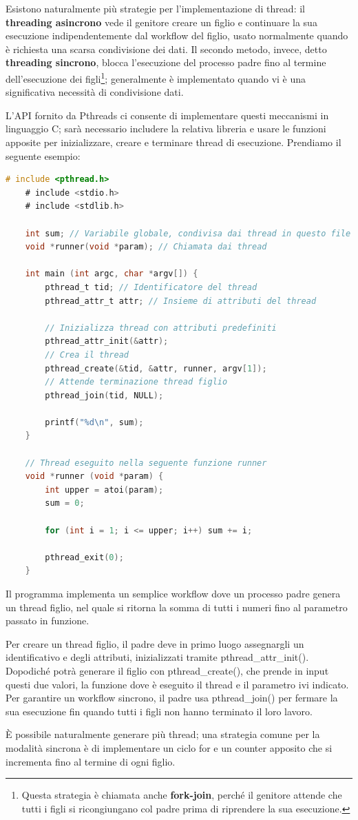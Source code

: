 \noindent Esistono naturalmente più strategie per l'implementazione di thread: il \textbf{threading asincrono} vede il genitore creare un figlio e
continuare la sua esecuzione indipendentemente dal workflow del figlio, usato normalmente quando è richiesta una scarsa condivisione dei dati. Il
secondo metodo, invece, detto \textbf{threading sincrono}, blocca l'esecuzione del processo padre fino al termine dell'esecuzione dei
figli\footnote{Questa strategia è chiamata anche \textbf{fork-join}, perché il genitore attende che tutti i figli si ricongiungano col padre prima di
riprendere la sua esecuzione.}; generalmente è implementato quando vi è una significativa necessità di condivisione dati.\par
L'API fornito da Pthreads ci consente di implementare questi meccanismi in linguaggio C; sarà necessario includere la relativa libreria e usare le
funzioni apposite per inizializzare, creare e terminare thread di esecuzione. Prendiamo il seguente esempio: \begin{lstlisting}[language=C]
	# include <pthread.h>
	# include <stdio.h>
	# include <stdlib.h>
	
	int sum; // Variabile globale, condivisa dai thread in questo file
	void *runner(void *param); // Chiamata dai thread
	
	int main (int argc, char *argv[]) {
		pthread_t tid; // Identificatore del thread
		pthread_attr_t attr; // Insieme di attributi del thread
		
		// Inizializza thread con attributi predefiniti
		pthread_attr_init(&attr);
		// Crea il thread
		pthread_create(&tid, &attr, runner, argv[1]);
		// Attende terminazione thread figlio
		pthread_join(tid, NULL);
		
		printf("%d\n", sum);
	}
	
	// Thread eseguito nella seguente funzione runner
	void *runner (void *param) {
		int upper = atoi(param);
		sum = 0;
		
		for (int i = 1; i <= upper; i++) sum += i;
		
		pthread_exit(0);
	}
\end{lstlisting}

\noindent Il programma implementa un semplice workflow dove un processo padre genera un thread figlio, nel quale si ritorna la somma di tutti i numeri
fino al parametro passato in funzione.\par
Per creare un thread figlio, il padre deve in primo luogo assegnargli un identificativo e degli attributi, inizializzati tramite pthread\_attr\_init().
Dopodiché potrà generare il figlio con pthread\_create(), che prende in input questi due valori, la funzione dove è eseguito il thread e il parametro
ivi indicato. Per garantire un workflow sincrono, il padre usa pthread\_join() per fermare la sua esecuzione fin quando tutti i figli non hanno
terminato il loro lavoro.\par
È possibile naturalmente generare più thread; una strategia comune per la modalità sincrona è di implementare un ciclo for e un counter apposito che si
incrementa fino al termine di ogni figlio.

